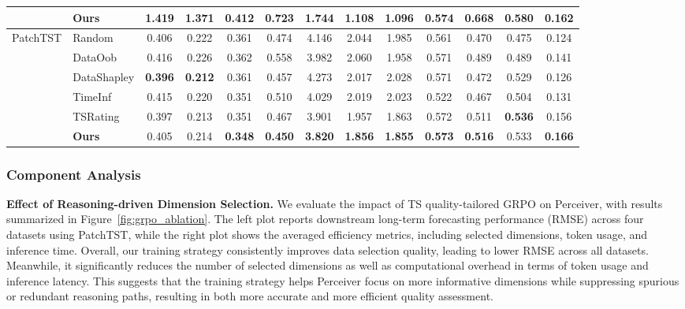 \documentclass{article}
\newcommand{\partitle}[1]{\smallskip \noindent \textbf{#1.}}
\begin{document}
\begin{table}[t]
\begin{tabular}{l l | c c c c | c c c | c c c c}
        \rowcolor{cyan!10}
        & \textbf{Ours} & \textbf{1.419} & \textbf{1.371} & \textbf{0.412} & \textbf{0.723} & \textbf{1.744} & 1.108 & \textbf{1.096} & \textbf{0.574} & 0.668 & \textbf{0.580} & \textbf{0.162} \\
    \midrule
    \multirow{5}{*}{PatchTST}
        & Random      & 0.406 & 0.222 & 0.361 & 0.474 & 4.146 & 2.044 & 1.985 & 0.561 & 0.470 & 0.475 & 0.124 \\
        & DataOob     & 0.416 & 0.226 & 0.362 & 0.558 & 3.982 & 2.060 & 1.958 & 0.571 & 0.489 & 0.489 & 0.141 \\
        & DataShapley & \textbf{0.396} & \textbf{0.212} & 0.361 & 0.457 & 4.273 & 2.017 & 2.028 & 0.571 & 0.472 & 0.529 & 0.126 \\
        & TimeInf     & 0.415 & 0.220 & 0.351 & 0.510 & 4.029 & 2.019 & 2.023 & 0.522 & 0.467 & 0.504 & 0.131 \\
        & TSRating    & 0.397 & 0.213 & 0.351 & 0.467 & 3.901 & 1.957 & 1.863 & 0.572 & 0.511 & \textbf{0.536} & 0.156 \\
        \rowcolor{cyan!10}
        & \textbf{Ours} & 0.405 & 0.214 & \textbf{0.348} & \textbf{0.450} & \textbf{3.820} & \textbf{1.856} & \textbf{1.855} & \textbf{0.573} & \textbf{0.516} & 0.533 & \textbf{0.166} \\
    \bottomrule
  \end{tabular}
  \vspace{-1.0em}
\end{table}

\subsubsection{Component Analysis}

\partitle{Effect of Reasoning-driven Dimension Selection}
We evaluate the impact of TS quality-tailored GRPO on Perceiver, with results summarized in Figure~\ref{fig:grpo_ablation}. The left plot reports downstream long-term forecasting performance (RMSE) across four datasets using PatchTST, while the right plot shows the averaged efficiency metrics, including selected dimensions, token usage, and inference time.
Overall, our training strategy consistently improves data selection quality, leading to lower RMSE across all datasets. Meanwhile, it significantly reduces the number of selected dimensions as well as computational overhead in terms of token usage and inference latency. This suggests that the training strategy helps Perceiver focus on more informative dimensions while suppressing spurious or redundant reasoning paths, resulting in both more accurate and more efficient quality assessment.
\end{document}

